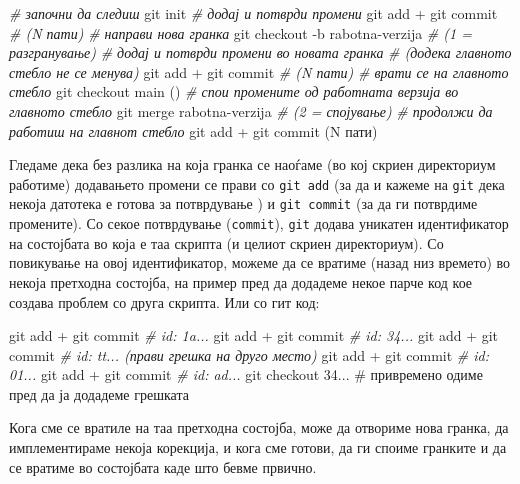 \documentclass[
]{book}
\newenvironment{Shaded}{\begin{snugshade}}{\end{snugshade}}
\newcommand{\CommentTok}[1]{\textcolor[rgb]{0.56,0.35,0.01}{\textit{#1}}}
\newcommand{\FunctionTok}[1]{\textcolor[rgb]{0.00,0.00,0.00}{#1}}
\newcommand{\NormalTok}[1]{#1}
\begin{document}
\begin{Shaded}
\begin{Highlighting}[]
\CommentTok{\# започни да следиш}
\FunctionTok{git}\NormalTok{ init}
\CommentTok{\# додај и потврди промени}
\FunctionTok{git}\NormalTok{ add + git commit }\CommentTok{\# (N пати)}
\CommentTok{\# направи нова гранка}
\FunctionTok{git}\NormalTok{ checkout {-}b rabotna{-}verzija }\CommentTok{\# (1 = разгранување)}
\CommentTok{\# додај и потврди промени во новата гранка }
\CommentTok{\# (додека главното стебло не се менува)}
\FunctionTok{git}\NormalTok{ add + git commit }\CommentTok{\# (N пати)}
\CommentTok{\# врати се на главното стебло}
\FunctionTok{git}\NormalTok{ checkout main ()}
\CommentTok{\# спои промените од работната верзија во главното стебло}
\FunctionTok{git}\NormalTok{ merge rabotna{-}verzija }\CommentTok{\# (2 = спојување)}
\CommentTok{\# продолжи да работиш на главнот стебло}
\FunctionTok{git}\NormalTok{ add + git commit (N пати)}
\end{Highlighting}
\end{Shaded}

Гледаме дека без разлика на која гранка се наоѓаме (во кој скриен директориум работиме) додавањето промени се прави со \texttt{git\ add} (за да и кажеме на \texttt{git} дека некоја датотека е готова за потврдување ) и \texttt{git\ commit} (за да ги потврдиме промените). Со секое потврдување (\texttt{commit}), \texttt{git} додава уникатен идентификатор на состојбата во која е таа скрипта (и целиот скриен директориум). Со повикување на овој идентификатор, можеме да се вратиме (назад низ времето) во некоја претходна состојба, на пример пред да додадеме некое парче код кое создава проблем со друга скрипта. Или со гит код:

\begin{Shaded}
\begin{Highlighting}[]

\FunctionTok{git}\NormalTok{ add + git commit }\CommentTok{\# id: 1a...}
\FunctionTok{git}\NormalTok{ add + git commit }\CommentTok{\# id: 34...}
\FunctionTok{git}\NormalTok{ add + git commit }\CommentTok{\# id: tt... (прави грешка на друго место)}
\FunctionTok{git}\NormalTok{ add + git commit }\CommentTok{\# id: 01...}
\FunctionTok{git}\NormalTok{ add + git commit }\CommentTok{\# id: ad...}
\FunctionTok{git}\NormalTok{ checkout 34...   \# привремено одиме пред да ја додадеме грешката}
\end{Highlighting}
\end{Shaded}

Кога сме се вратиле на таа претходна состојба, може да отвориме нова гранка, да имплементираме некоја корекција, и кога сме готови, да ги споиме гранките и да се вратиме во состојбата каде што бевме првично.
\end{document}
